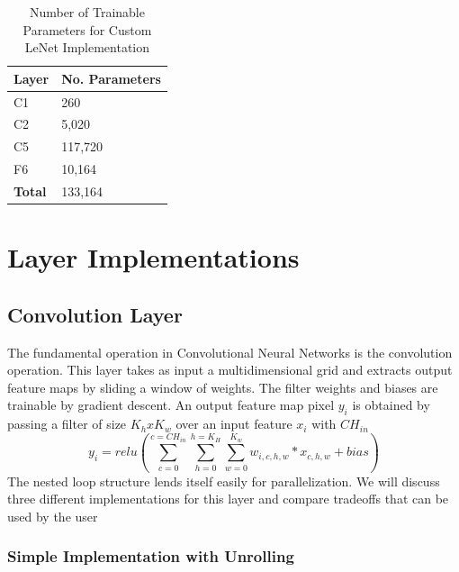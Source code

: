 \begin{table}[]
\centering
\begin{tabular}{ll}
\hline
\multicolumn{1}{|l|}{\textbf{Layer}} & \multicolumn{1}{l|}{ \textbf{No. Parameters}} \\ \hline
\multicolumn{1}{|l|}{C1}    & \multicolumn{1}{l|}{260}                            \\ \hline
\multicolumn{1}{|l|}{C2}    & \multicolumn{1}{l|}{5,020}                          \\ \hline
\multicolumn{1}{|l|}{C5}    & \multicolumn{1}{l|}{117,720}                        \\ \hline
\multicolumn{1}{|l|}{F6}    & \multicolumn{1}{l|}{10,164}                        \\ \hline
\multicolumn{1}{|l|}{\textbf{Total}}    & \multicolumn{1}{l|}{133,164}                        \\ \hline
\end{tabular}
\label{tab:custom-lenet}        
\caption{Number of Trainable Parameters for Custom LeNet Implementation}             
\end{table}


\section{Layer Implementations}

\subsection{Convolution Layer}

The fundamental operation in Convolutional Neural Networks is the convolution operation. This layer takes as input a multidimensional grid and extracts output feature maps by sliding a window of weights. The filter weights and biases are trainable by gradient descent. An output feature map pixel $ \mathit{y_{i}} $ is obtained by passing a filter of size $ K_{h}xK_{w} $ over an input feature $ \mathit{x_{i}} $ with $ \mathit{CH_{in}} $
\begin{equation}
 y_{i} = relu(\sum_{c=0}^{c=CH_{in}} \sum_{h=0}^{h=K_{H}} \sum_{w=0}^{K_{w}} w_{i,c,h,w} * x_{c,h,w}  + bias ) 
\end{equation}
The nested loop structure lends itself easily for parallelization.  We will discuss three different implementations for this layer and compare tradeoffs that can be used by the user 

\subsubsection{Simple Implementation with Unrolling} \label{simpleimpl}

